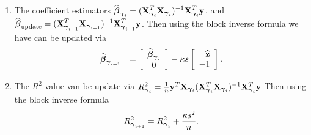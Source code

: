 \documentclass{article}[12pt]
\begin{document}
\begin{enumerate}
	\item
	The coefficient estimators 
	$ 
	\displaystyle \widehat{{\boldsymbol \beta}}_{{\boldsymbol \gamma}_{i}} = ({\bf X}_{{\boldsymbol \gamma}_{i}}^T{\bf X}_{{\boldsymbol \gamma}_{i}})^{-1}{\bf X}_{{\boldsymbol \gamma}_{i}}^T{\bf y}$,
	and $\displaystyle \widehat{{\boldsymbol \beta}}_{\mbox{\scriptsize update}}  = ({\bf X}_{{\boldsymbol \gamma}_{i+1}}^T{\bf X}_{{\boldsymbol \gamma}_{i+1}})^{-1}{\bf X}_{{\boldsymbol \gamma}_{i+1}}^T{\bf y}$.  
	Then using the block inverse formula we have
	can be updated via
	$$
	\begin{array}{rl}
	\displaystyle \widehat{{\boldsymbol \beta}}_{{\boldsymbol \gamma}_{i+1}}
	& \displaystyle 
	= \left[ \begin{array}{c}
	\widehat{{\boldsymbol \beta}}_{{\boldsymbol \gamma}_{i}} \\
	0 
	\end{array} \right] - \kappa s  \left[ \begin{array}{r}
	\widehat{{\bf z}}   \\
	- 1
	\end{array} \right].
	\end{array} 
	$$
	
	\item The $R^2$ value van be update via
	$R_{\vgamma_{i}}^2 = \tfrac{1}{n} \vy^T\mX_{\vgamma_{i}}(\mX_{\vgamma_{i}}^T\mX_{\vgamma_{i}})^{-1}\mX_{\vgamma_{i}}^T\vy$
	Then using the block inverse formula
	$$
	\begin{array}{rl}
	\ds 
	R_{\vgamma_{i+1}}^2 
	= R_{\vgamma_{i}}^2
	+ \frac{\kappa s^2}{n}.
	
	\end{array}
	$$
	
\end{enumerate}
\end{document}
